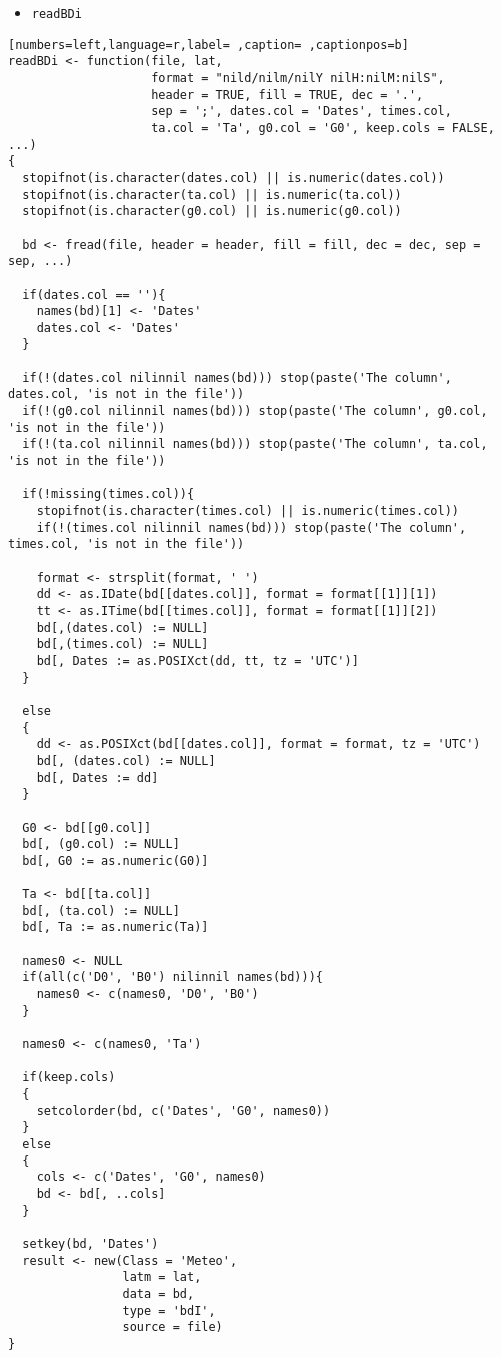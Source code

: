 \begin{itemize}
\item \texttt{readBDi}
\end{itemize}
\begin{lstlisting}[numbers=left,language=r,label= ,caption= ,captionpos=b]
readBDi <- function(file, lat,
                    format = "nild/nilm/nilY nilH:nilM:nilS",
                    header = TRUE, fill = TRUE, dec = '.',
                    sep = ';', dates.col = 'Dates', times.col,
                    ta.col = 'Ta', g0.col = 'G0', keep.cols = FALSE, ...)
{
  stopifnot(is.character(dates.col) || is.numeric(dates.col))
  stopifnot(is.character(ta.col) || is.numeric(ta.col))
  stopifnot(is.character(g0.col) || is.numeric(g0.col))

  bd <- fread(file, header = header, fill = fill, dec = dec, sep = sep, ...)

  if(dates.col == ''){
    names(bd)[1] <- 'Dates'
    dates.col <- 'Dates'
  }

  if(!(dates.col nilinnil names(bd))) stop(paste('The column', dates.col, 'is not in the file'))
  if(!(g0.col nilinnil names(bd))) stop(paste('The column', g0.col, 'is not in the file'))
  if(!(ta.col nilinnil names(bd))) stop(paste('The column', ta.col, 'is not in the file'))

  if(!missing(times.col)){
    stopifnot(is.character(times.col) || is.numeric(times.col))
    if(!(times.col nilinnil names(bd))) stop(paste('The column', times.col, 'is not in the file'))

    format <- strsplit(format, ' ')
    dd <- as.IDate(bd[[dates.col]], format = format[[1]][1])
    tt <- as.ITime(bd[[times.col]], format = format[[1]][2])
    bd[,(dates.col) := NULL]
    bd[,(times.col) := NULL]
    bd[, Dates := as.POSIXct(dd, tt, tz = 'UTC')]
  }

  else
  {
    dd <- as.POSIXct(bd[[dates.col]], format = format, tz = 'UTC')
    bd[, (dates.col) := NULL]
    bd[, Dates := dd]
  }

  G0 <- bd[[g0.col]]
  bd[, (g0.col) := NULL]
  bd[, G0 := as.numeric(G0)]

  Ta <- bd[[ta.col]]
  bd[, (ta.col) := NULL]
  bd[, Ta := as.numeric(Ta)]

  names0 <- NULL
  if(all(c('D0', 'B0') nilinnil names(bd))){
    names0 <- c(names0, 'D0', 'B0')
  }

  names0 <- c(names0, 'Ta')

  if(keep.cols)
  {
    setcolorder(bd, c('Dates', 'G0', names0))
  }
  else
  {
    cols <- c('Dates', 'G0', names0)
    bd <- bd[, ..cols]
  }

  setkey(bd, 'Dates')
  result <- new(Class = 'Meteo',
                latm = lat,
                data = bd,
                type = 'bdI',
                source = file)
}
\end{lstlisting}
